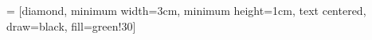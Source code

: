  = [diamond, minimum width=3cm, minimum height=1cm, text centered, draw=black, fill=green!30]


\begin{comment}

Arrows                      :   https://tikz.dev/tikz-arrows
Node alignment              :   https://tikz.net/contents/chapter-03-drawing-positioning-and-aligning-nodes/
Array/Matrix                :   https://tikz.dev/tikz-matrices
draw in table               :   baseline=0 to fit picture in table cell.
package for vectorgraphics  :   PGF, PGFPlots

\end{comment}



\begin{comment}

    \begin{center} \begin{tikzpicture}[ baseline=0, node distance=1.5cm]
        \node (start) [flowchart-start] {P - Q};
        \node (S1) [flowchart-process, below of=start] { Q1 = 1's complement of Q };
        \node (S2) [flowchart-process, below of=S1] { R = P + Q1 };
        \node (S3) [flowchart-decision, below of=S2, yshift=-0.5cm] { Carry? };xx
        \node (S4) [flowchart-start, below left=2cm of S3] { Result = R + carry};
        \node (S5) [flowchart-start, below right=2cm of S3] {Result = R1};

        \draw [flowchart-arrow] (start) -- (S1); \draw [flowchart-arrow] (S1) -- (S2); \draw [flowchart-arrow] (S2) -- (S3);
        \draw [flowchart-arrow] (S3.west) -| node[right of= S3, xshift=-1cm, yshift=0.2cm] {Yes} (S4.north);
        \draw [flowchart-arrow] (S3.east) -| node[right of= S3, xshift=-3cm, yshift=0.2cm] {No} (S5.north);

    \end{tikzpicture} \end{center}


    \begin{center} \begin{tikzpicture}[ baseline=0]
    \matrix [draw=white,column sep=0cm]
    {
        \node[draw=black!60] {8}; & \node[draw=black!60]{1}; & \node[draw=black!60] {6}; \\
        \node[draw=blue!60] {8}; & \node[draw=blue!60]{1}; & \node[draw=blue!60] {6}; \\
    };
    \end{tikzpicture} \end{center}


\end{comment}
